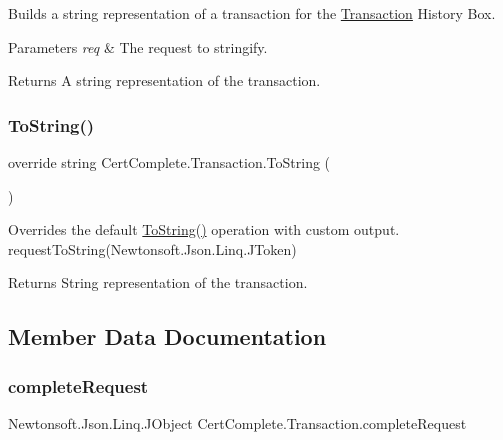 Builds a string representation of a transaction for the \mbox{\hyperlink{class_cert_complete_1_1_transaction}{Transaction}} History Box. 


\begin{DoxyParams}{Parameters}
{\em req} & The request to stringify.\\
\hline
\end{DoxyParams}
\begin{DoxyReturn}{Returns}
A string representation of the transaction.
\end{DoxyReturn}
\mbox{\label{class_cert_complete_1_1_transaction_a5535efa45706c133127a346d8c33543a}} 
\subsubsection{\texorpdfstring{To\+String()}{ToString()}}
{\footnotesize\ttfamily override string Cert\+Complete.\+Transaction.\+To\+String (\begin{DoxyParamCaption}{ }\end{DoxyParamCaption})\hspace{0.3cm}{\ttfamily [inline]}}



Overrides the default \mbox{\hyperlink{class_cert_complete_1_1_transaction_a5535efa45706c133127a346d8c33543a}{To\+String()}} operation with custom output. request\+To\+String(\+Newtonsoft.\+Json.\+Linq.\+J\+Token) 

\begin{DoxyReturn}{Returns}
String representation of the transaction.
\end{DoxyReturn}


\subsection{Member Data Documentation}
\mbox{\label{class_cert_complete_1_1_transaction_a12fd763cddcfee8900bbc87b2473bdf5}} 
\subsubsection{\texorpdfstring{complete\+Request}{completeRequest}}
{\footnotesize\ttfamily Newtonsoft.\+Json.\+Linq.\+J\+Object Cert\+Complete.\+Transaction.\+complete\+Request\hspace{0.3cm}{\ttfamily [private]}}

